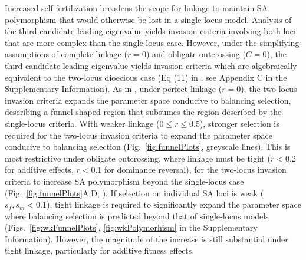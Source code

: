\documentclass{article}
\begin{document}
Increased self-fertilization broadens the scope for linkage to maintain SA polymorphism that would otherwise be lost in a single-locus model. Analysis of the third candidate leading eigenvalue yields invasion criteria involving both loci that are more complex than the single-locus case. {\color{blue} However, under the simplifying assumptions of complete linkage ($r=0$) and obligate outcrossing ($C=0$), the third candidate leading eigenvalue yields invasion criteria which are algebraically equivalent to the two-locus dioecious case (Eq (11) in \citealt{Patten2010}; see Appendix C in the Supplementary Information)}. As in \citet{Patten2010}, under perfect linkage ($r=0$), the two-locus invasion criteria expands the parameter space conducive to balancing selection, describing a funnel-shaped region that subsumes the region described by the single-locus criteria. With weaker linkage ($0 \leq r \leq 0.5$), stronger selection is required for the two-locus invasion criteria to expand the parameter space conducive to balancing selection (Fig.~\ref{fig:funnelPlots}, greyscale lines). This is most restrictive under obligate outcrossing, where linkage must be tight ($r < 0.2$ for additive effects, $r < 0.1$ for dominance reversal), for the two-locus invasion criteria to increase SA polymorphism beyond the single-locus case (Fig.~\ref{fig:funnelPlots}A,D; \citealt{Patten2010}). If selection on individual SA loci is weak ($s_f,s_m < 0.1$), tight linkage is required to significantly expand the parameter space where balancing selection is predicted beyond that of single-locus models (Figs.~\ref{fig:wkFunnelPlots}, \ref{fig:wkPolymorhism} in the Supplementary Information). However, the magnitude of the increase is still substantial under tight linkage, particularly for additive fitness effects.
\end{document}
